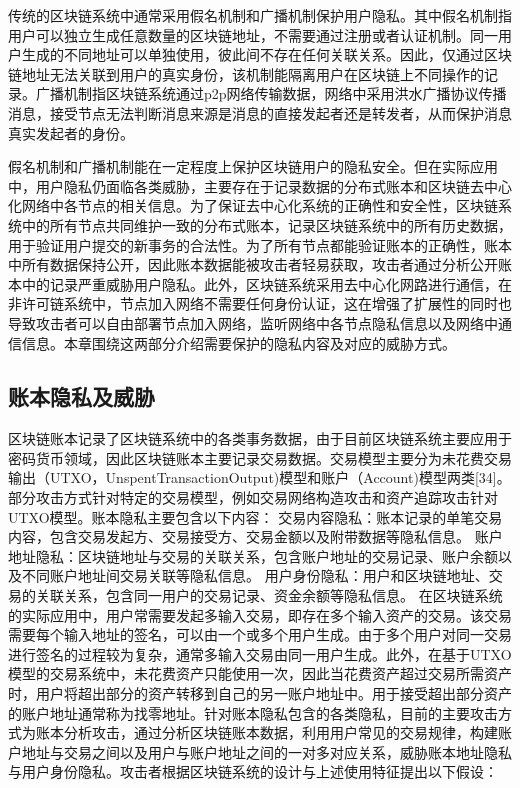 传统的区块链系统中通常采用假名机制和广播机制保护用户隐私。其中假名机制指用户可以独立生成任意数量的区块链地址，不需要通过注册或者认证机制。同一用户生成的不同地址可以单独使用，彼此间不存在任何关联关系。因此，仅通过区块链地址无法关联到用户的真实身份，该机制能隔离用户在区块链上不同操作的记录。广播机制指区块链系统通过p2p网络传输数据，网络中采用洪水广播协议传播消息，接受节点无法判断消息来源是消息的直接发起者还是转发者，从而保护消息真实发起者的身份。

假名机制和广播机制能在一定程度上保护区块链用户的隐私安全。但在实际应用中，用户隐私仍面临各类威胁，主要存在于记录数据的分布式账本和区块链去中心化网络中各节点的相关信息。为了保证去中心化系统的正确性和安全性，区块链系统中的所有节点共同维护一致的分布式账本，记录区块链系统中的所有历史数据，用于验证用户提交的新事务的合法性。为了所有节点都能验证账本的正确性，账本中所有数据保持公开，因此账本数据能被攻击者轻易获取，攻击者通过分析公开账本中的记录严重威胁用户隐私。此外，区块链系统采用去中心化网路进行通信，在非许可链系统中，节点加入网络不需要任何身份认证，这在增强了扩展性的同时也导致攻击者可以自由部署节点加入网络，监听网络中各节点隐私信息以及网络中通信信息。本章围绕这两部分介绍需要保护的隐私内容及对应的威胁方式。

\subsection{账本隐私及威胁}

区块链账本记录了区块链系统中的各类事务数据，由于目前区块链系统主要应用于密码货币领域，因此区块链账本主要记录交易数据。交易模型主要分为未花费交易输出（UTXO，UnspentTransactionOutput)模型和账户（Account)模型两类[34]。部分攻击方式针对特定的交易模型，例如交易网络构造攻击和资产追踪攻击针对UTXO模型。账本隐私主要包含以下内容：
交易内容隐私：账本记录的单笔交易内容，包含交易发起方、交易接受方、交易金额以及附带数据等隐私信息。
账户地址隐私：区块链地址与交易的关联关系，包含账户地址的交易记录、账户余额以及不同账户地址间交易关联等隐私信息。
用户身份隐私：用户和区块链地址、交易的关联关系，包含同一用户的交易记录、资金余额等隐私信息。
在区块链系统的实际应用中，用户常需要发起多输入交易，即存在多个输入资产的交易。该交易需要每个输入地址的签名，可以由一个或多个用户生成。由于多个用户对同一交易进行签名的过程较为复杂，通常多输入交易由同一用户生成。此外，在基于UTXO模型的交易系统中，未花费资产只能使用一次，因此当花费资产超过交易所需资产时，用户将超出部分的资产转移到自己的另一账户地址中。用于接受超出部分资产的账户地址通常称为找零地址。针对账本隐私包含的各类隐私，目前的主要攻击方式为账本分析攻击，通过分析区块链账本数据，利用用户常见的交易规律，构建账户地址与交易之间以及用户与账户地址之间的一对多对应关系，威胁账本地址隐私与用户身份隐私。攻击者根据区块链系统的设计与上述使用特征提出以下假设：

